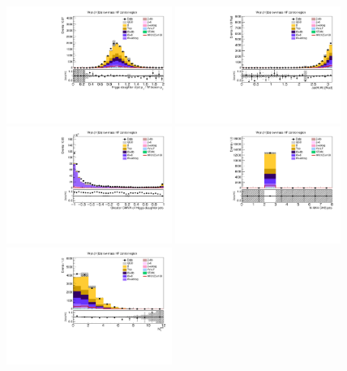 \begin{figure}[tbp]
  \begin{center}
    \includegraphics[width=0.48\textwidth]{figures/wlnhbb2016/resolved/WenWHHeavyFlavorCRLowMass_pTBalanceDijetW.pdf}
    \includegraphics[width=0.48\textwidth]{figures/wlnhbb2016/resolved/WenWHHeavyFlavorCRLowMass_deltaPhiVH.pdf}
    \includegraphics[width=0.48\textwidth]{figures/wlnhbb2016/resolved/WenWHHeavyFlavorCRLowMass_bDiscrMax.pdf}
    \includegraphics[width=0.48\textwidth]{figures/wlnhbb2016/resolved/WenWHHeavyFlavorCRLowMass_nJet.pdf}
    \includegraphics[width=0.48\textwidth]{figures/wlnhbb2016/resolved/WenWHHeavyFlavorCRLowMass_nSoft5.pdf}

\end{center}
\end{figure}
